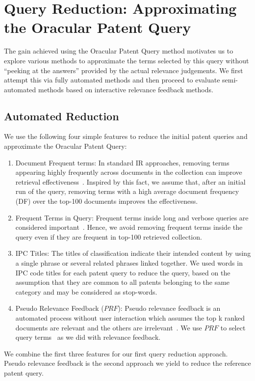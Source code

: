 \section{Query Reduction: Approximating the Oracular Patent Query}
The gain achieved using the Oracular Patent Query method motivates us to explore various methods to approximate the terms
selected by this query without ``peeking at the answers'' provided by
the actual relevance judgements.  We first attempt this via fully
automated methods and then proceed to evaluate semi-automated methods
based on interactive relevance feedback methods.
\subsection{Automated Reduction}
We use the following four simple features to reduce the initial patent queries and approximate the Oracular Patent Query: 
\begin{enumerate}
\item Document Frequent terms: In standard IR approaches, removing terms appearing highly frequently across documents in the collection can improve retrieval effectiveness~\citep{manning2008introduction}. Inspired by this fact, we assume that, after an initial run of the query, removing terms  with a high average document frequency (DF) over the top-100 documents improves the effectiveness. 
\item Frequent Terms in Query: Frequent terms inside long and verbose queries are considered important~\citep{maxwell2013compact}. Hence, we avoid removing frequent terms inside the query even if they are frequent in top-100 retrieved collection.
\item IPC Titles: The titles of classification indicate their intended content by using a single phrase or several related phrases linked together. We used words in IPC code titles for each patent query to reduce the query, based on the assumption that they are common to all patents belonging to the same category and may be considered as stop-words.
\item Pseudo Relevance Feedback ($\mathit{PRF}$): Pseudo relevance feedback is an automated process without user interaction which assumes the top k ranked documents are relevant and the others are irrelevant~\citep{Baeza-Yates2011}. We use $\mathit{PRF}$ to select query terms~\cite{maxwell2013compact} as we did with relevance feedback.
\end{enumerate}
We combine the first three features for our first query reduction approach. Pseudo relevance feedback is the second approach we yield to reduce the reference patent query. 
